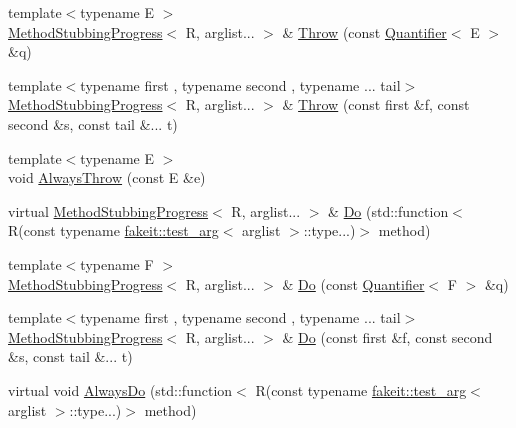 \begin{DoxyCompactItemize}
\item 
{\footnotesize template$<$typename E $>$ }\\\mbox{\hyperlink{structfakeit_1_1MethodStubbingProgress}{Method\+Stubbing\+Progress}}$<$ R, arglist... $>$ \& \mbox{\hyperlink{structfakeit_1_1MethodStubbingProgress_a93c74210adfc0ec4662aff15f78834c7}{Throw}} (const \mbox{\hyperlink{structfakeit_1_1Quantifier}{Quantifier}}$<$ E $>$ \&q)
\item 
{\footnotesize template$<$typename first , typename second , typename ... tail$>$ }\\\mbox{\hyperlink{structfakeit_1_1MethodStubbingProgress}{Method\+Stubbing\+Progress}}$<$ R, arglist... $>$ \& \mbox{\hyperlink{structfakeit_1_1MethodStubbingProgress_a516a0ade529c61e4ab6df1bf47f3f1b2}{Throw}} (const first \&f, const second \&s, const tail \&... t)
\item 
{\footnotesize template$<$typename E $>$ }\\void \mbox{\hyperlink{structfakeit_1_1MethodStubbingProgress_a4efb736b0529123d9c5ed87630e11ac2}{Always\+Throw}} (const E \&e)
\item 
virtual \mbox{\hyperlink{structfakeit_1_1MethodStubbingProgress}{Method\+Stubbing\+Progress}}$<$ R, arglist... $>$ \& \mbox{\hyperlink{structfakeit_1_1MethodStubbingProgress_a9ef4c2db8e567aa312b708613d240ae1}{Do}} (std\+::function$<$ R(const typename \mbox{\hyperlink{structfakeit_1_1test__arg}{fakeit\+::test\+\_\+arg}}$<$ arglist $>$\+::type...)$>$ method)
\item 
{\footnotesize template$<$typename F $>$ }\\\mbox{\hyperlink{structfakeit_1_1MethodStubbingProgress}{Method\+Stubbing\+Progress}}$<$ R, arglist... $>$ \& \mbox{\hyperlink{structfakeit_1_1MethodStubbingProgress_a59f9d7ab7c86b809ce25b41d05b58ad2}{Do}} (const \mbox{\hyperlink{structfakeit_1_1Quantifier}{Quantifier}}$<$ F $>$ \&q)
\item 
{\footnotesize template$<$typename first , typename second , typename ... tail$>$ }\\\mbox{\hyperlink{structfakeit_1_1MethodStubbingProgress}{Method\+Stubbing\+Progress}}$<$ R, arglist... $>$ \& \mbox{\hyperlink{structfakeit_1_1MethodStubbingProgress_a157561400e37da65c5b48f4466fc603c}{Do}} (const first \&f, const second \&s, const tail \&... t)
\item 
virtual void \mbox{\hyperlink{structfakeit_1_1MethodStubbingProgress_a47464ab35cb06c00dbd00a13328b80a7}{Always\+Do}} (std\+::function$<$ R(const typename \mbox{\hyperlink{structfakeit_1_1test__arg}{fakeit\+::test\+\_\+arg}}$<$ arglist $>$\+::type...)$>$ method)
\end{DoxyCompactItemize}
